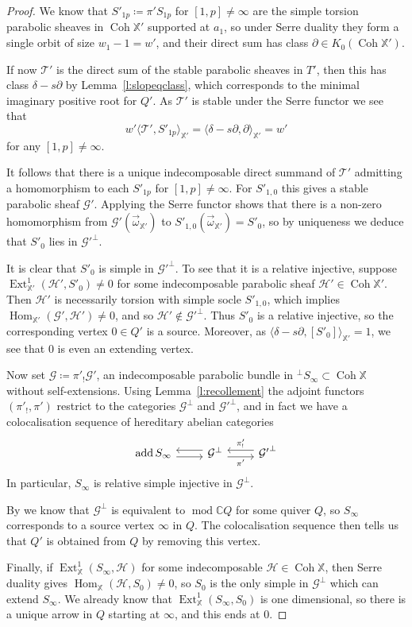 \documentclass[12pt,a4paper]{amsart}
\theoremstyle{plain}
\newcommand{\C}{\mathbb C}
\DeclareMathOperator{\Coh}{Coh}
\DeclareMathOperator{\add}{add}
\DeclareMathOperator{\mmod}{mod}
\DeclareMathOperator{\Hom}{Hom}
\DeclareMathOperator{\Ext}{Ext}
\newcommand{\G}{\mathcal G}
\newcommand{\XX}{\mathbb X}
\newcommand{\oom}{\vec{\omega}}
\begin{document}
\begin{proof}
We know that $S'_{1p}\coloneqq\pi'S_{1p}$ for $[1,p]\neq\infty$ are the simple torsion parabolic sheaves in $\Coh\XX'$ supported at $a_1$, so under Serre duality they form a single orbit of size $w_1-1=w'$, and their direct sum has class $\partial\in K_0(\Coh\XX')$.

If now $\mathcal T'$ is the direct sum of the stable parabolic sheaves in $T'$, then this has class $\delta-s\partial$ by Lemma~\ref{l:slopeqclass}, which corresponds to the minimal imaginary positive root for $Q'$. As $\mathcal T'$ is stable under the Serre functor we see that
\[ w'\langle\mathcal T',S'_{1p}\rangle_{\XX'} = \langle\delta-s\partial,\partial\rangle_{\XX'} = w' \]
for any $[1,p]\neq\infty$.

It follows that there is a unique indecomposable direct summand of $\mathcal T'$ admitting a homomorphism to each $S'_{1p}$ for $[1,p]\neq\infty$. For $S'_{1,0}$ this gives a stable parabolic sheaf $\G'$. Applying the Serre functor shows that there is a non-zero homomorphism from $\G'(\oom_{\XX'})$ to $S'_{1,0}(\oom_{\XX'})=S'_0$, so by uniqueness we deduce that $S'_0$ lies in ${\G'}^\perp$.

It is clear that $S'_0$ is simple in ${\G'}^\perp$. To see that it is a relative injective, suppose $\Ext^1_{\XX'}(\mathcal H',S'_0)\neq0$ for some indecomposable parabolic sheaf $\mathcal H'\in\Coh\XX'$. Then $\mathcal H'$ is necessarily torsion with simple socle $S'_{1,0}$, which implies $\Hom_{\XX'}(\G',\mathcal H')\neq0$, and so $\mathcal H'\notin{\G'}^\perp$. Thus $S'_0$ is a relative injective, so the corresponding vertex $0\in Q'$ is a source. Moreover, as $\langle\delta-s\partial,[S'_0]\rangle_{\XX'}=1$, we see that $0$ is even an extending vertex.

Now set $\G\coloneqq\pi'_!\G'$, an indecomposable parabolic bundle in ${}^\perp S_\infty\subset\Coh\XX$ without self-extensions. Using Lemma~\ref{l:recollement} the adjoint functors $(\pi'_!,\pi')$ restrict to the categories $\G^\perp$ and ${\G'}^\perp$, and in fact we have a colocalisation sequence of hereditary abelian categories
\[ \begin{tikzcd}
\add S_\infty \arrow[r,yshift=-3pt] & \G^\perp \arrow[r,yshift=-3pt,"\pi'" swap] \arrow[l,yshift=3pt]
& {\G'}^\perp \arrow[l,yshift=3pt,"\pi'_!" swap]
\end{tikzcd} \]
In particular, $S_\infty$ is relative simple injective in $\G^\perp$.

By \cite{HL} we know that $\G^\perp$ is equivalent to $\mmod\C Q$ for some quiver $Q$, so $S_\infty$ corresponds to a source vertex $\infty$ in $Q$. The colocalisation sequence then tells us that $Q'$ is obtained from $Q$ by removing this vertex.

Finally, if $\Ext^1_\XX(S_\infty,\mathcal H)$ for some indecomposable $\mathcal H\in\Coh\XX$, then Serre duality gives $\Hom_\XX(\mathcal H,S_0)\neq0$, so $S_0$ is the only simple in $\G^\perp$ which can extend $S_\infty$. We already know that $\Ext^1_\XX(S_\infty,S_0)$ is one dimensional, so there is a unique arrow in $Q$ starting at $\infty$, and this ends at $0$.
\end{proof}
\end{document}
